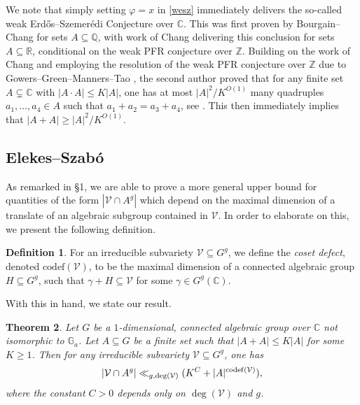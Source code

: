 \documentclass[12pt, reqno]{amsart}
\newcommand{\C}{\mathbb{C}}
\newtheorem{theorem}{Theorem}[section]
\theoremstyle{remark}
\theoremstyle{definition}
\newtheorem{definition}[theorem]{Definition}
\numberwithin{equation}{section}
\begin{document}
We note that simply setting $\varphi = x$ in \eqref{wesz} immediately delivers the so-called weak Erd\H{o}s--Szemer\'{e}di Conjecture over $\mathbb{C}$. This was first proven by Bourgain--Chang \cite{BC2004} for sets $A \subseteq \mathbb{Q}$, with work of Chang \cite{Ch2009} delivering this conclusion for sets $A \subseteq \mathbb{R}$, conditional on the weak PFR conjecture over $\mathbb{Z}$. Building on the work of Chang and employing the resolution of the weak PFR conjecture over $\mathbb{Z}$ due to Gowers--Green--Manners--Tao \cite{GGMT2025}, the second author proved that for any finite set $A \subsetneq \mathbb{C}$ with $|A \cdot A| \leq K|A|$, one has at most $|A|^2/K^{O(1)} $ many quadruples $a_1, \dots, a_4 \in A$ such that $a_1 + a_2 = a_3 + a_4$, see \cite[Proposition 1.5]{Mu2024c}. This then immediately implies that $|A+A| \geq |A|^2/K^{O(1)}$.










\subsection{Elekes--Szab\'{o}}

As remarked in \S1, we are able to prove a more general upper bound for quantities of the form $|\mathcal{V}\cap A^g|$ which depend on the maximal dimension of a translate of an algebraic subgroup contained in $\mathcal{V}$. In order to elaborate on this, we present the following definition.

\begin{definition}
    For an irreducible  subvariety $\mathcal{V} \subseteq G^g$, we define the \textit{coset defect}, denoted $\text{codef}(\mathcal{V})$, to be the maximal dimension of a connected algebraic group $H \subseteq G^g$, such that $\gamma + H \subseteq \mathcal{V}$ for some $\gamma \in G^g(\C)$.
\end{definition}

With this in hand, we state our result.


\begin{theorem} \label{elsz}
    Let $G$ be a $1$-dimensional, connected algebraic group over $\mathbb{C}$ not isomorphic to $\mathbb{G}_a$. Let $A \subseteq G$ be a finite set such that $|A + A| \leq K|A|$ for some $K \geq 1$. Then for any irreducible subvariety $\mathcal{V} \subseteq G^g$, one has
   \begin{align*}
       |\mathcal{V}\cap A^g| \ll_{g, \deg(\mathcal{V})} (K^{C} + |A|^{{\rm codef}(\mathcal{V})}),
   \end{align*} 
   where the constant $C>0$ depends only on $\deg(\mathcal{V})$ and $g$. 
\end{theorem} 
\end{document}
